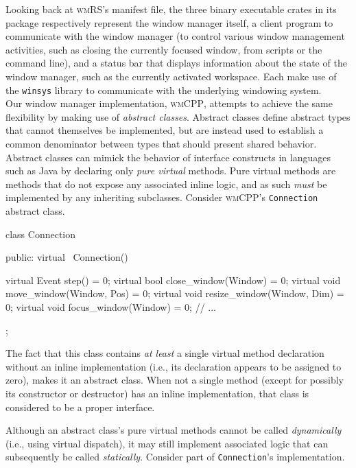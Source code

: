 Looking  back at  \textsc{wmRS}'s  manifest file,  the  three binary  executable
crates in its package respectively represent the window manager itself, a client
program  to communicate  with  the  window manager  (to  control various  window
management  activities,  such as  closing  the  currently focused  window,  from
scripts or the  command line), and a status bar  that displays information about
the state of the window manager, such as the currently activated workspace. Each
make  use of  the \texttt{winsys}  library  to communicate  with the  underlying
windowing system.\\

Our \cpp window manager implementation,  \textsc{wmCPP}, attempts to achieve the
same flexibility  by making use  of \textit{abstract classes}.  Abstract classes
define abstract  types that  cannot themselves be  implemented, but  are instead
used to establish a common denominator  between types that should present shared
behavior. Abstract  classes can mimick  the behavior of interface  constructs in
languages such  as Java  by declaring only  \textit{pure virtual}  methods. Pure
virtual methods are methods that do  not expose any associated inline logic, and
as  such \textit{must}  be implemented  by any  inheriting subclasses.  Consider
\textsc{wmCPP}'s \texttt{Connection} abstract class.


\begin{cppblock}
  class Connection
  {
  public:
    virtual ~Connection() {}
  
    virtual Event step() = 0;
    virtual bool close_window(Window) = 0;
    virtual void move_window(Window, Pos) = 0;
    virtual void resize_window(Window, Dim) = 0;
    virtual void focus_window(Window) = 0;
    // ...
  };
\end{cppblock}

The fact  that this  class contains  \textit{at least}  a single  virtual method
declaration  without an  inline  implementation (i.e.,  its declaration  appears
to  be  assigned to  zero),  makes  it an  abstract  class.  When not  a  single
method  (except  for possibly  its  constructor  or  destructor) has  an  inline
implementation, that class is considered to be a proper interface.

Although   an  abstract   class's  pure   virtual  methods   cannot  be   called
\textit{dynamically}  (i.e., using  virtual  dispatch), it  may still  implement
associated logic  that can subsequently be  called \textit{statically}. Consider
part of \texttt{Connection}'s implementation.

